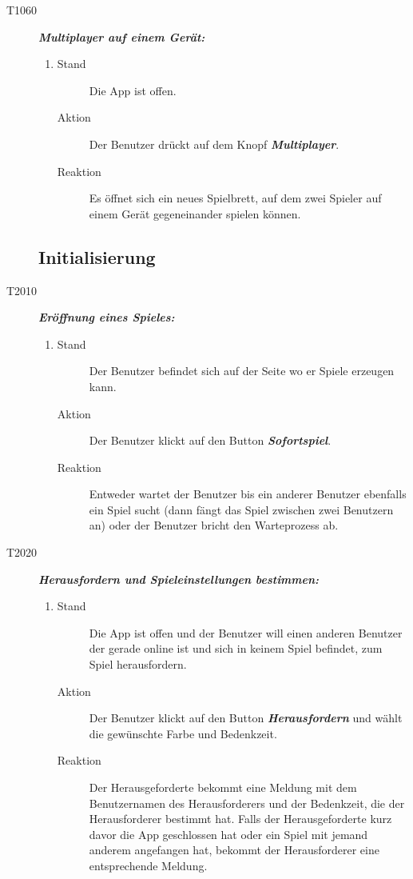 \documentclass[parskip=full]{scrartcl}
\begin{document}
\begin{description}
		\item[T1060] \textbf{\textit{Multiplayer auf einem Gerät: }} 
		\begin{enumerate}
			\item 
			\begin{description}
				\item[Stand] Die App ist offen.
				\item[Aktion] Der Benutzer drückt auf dem Knopf \textbf{\textit{Multiplayer}}.
				\item[Reaktion] Es öffnet sich ein neues Spielbrett, auf dem zwei Spieler auf einem Gerät gegeneinander spielen können.
			\end{description}
		\end{enumerate}
		
		\subsection{Initialisierung}
		\item[T2010] \textbf{\textit{Eröffnung eines Spieles: }} 
		\begin{enumerate}
			\item 
			\begin{description}
				\item[Stand] Der Benutzer befindet sich auf der Seite wo er Spiele erzeugen kann.
				\item[Aktion] Der Benutzer klickt auf den Button \textbf{\textit{Sofortspiel}}. 
				\item[Reaktion] Entweder wartet der Benutzer bis ein anderer Benutzer ebenfalls ein Spiel sucht (dann fängt das Spiel zwischen zwei Benutzern an) oder der Benutzer bricht den Warteprozess ab.
			\end{description}
		\end{enumerate}
		
		\item[T2020] \textbf{\textit{Herausfordern und Spieleinstellungen bestimmen: }} 
		\begin{enumerate}
			\item 
			\begin{description}
				\item[Stand] Die App ist offen und der Benutzer will einen anderen Benutzer der gerade online ist und sich in keinem Spiel befindet, zum Spiel herausfordern.
				\item[Aktion] Der Benutzer klickt auf den Button \textbf{\textit{Herausfordern }} und wählt die gewünschte Farbe und \gls{Bedenkzeit}.
				\item[Reaktion] Der Herausgeforderte bekommt eine Meldung mit dem Benutzernamen des Herausforderers und der \gls{Bedenkzeit}, die der Herausforderer bestimmt hat. Falls der Herausgeforderte kurz davor die App geschlossen hat oder ein Spiel mit jemand anderem angefangen hat, bekommt der Herausforderer eine entsprechende Meldung.
			\end{description}
		\end{enumerate}
		

\end{description}
\end{document}

